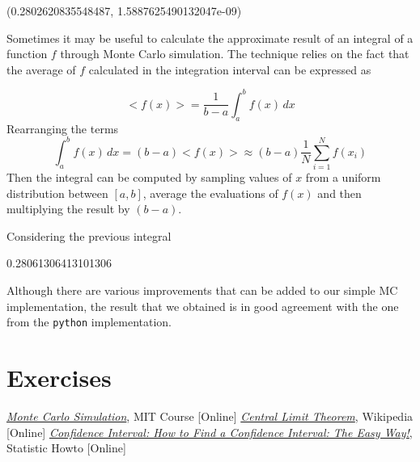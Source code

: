 \begin{ioutput}
(0.2802620835548487, 1.5887625490132047e-09)
\end{ioutput}

Sometimes it may be useful to calculate the approximate result of an integral of a function $f$ through Monte Carlo simulation. The technique relies on the fact that the average of $f$ calculated in the integration interval can be expressed as

\begin{equation}
<f(x)> = \frac{1}{b-a} \int_{a}^{b} f(x) \,dx
\end{equation}
Rearranging the terms
\begin{equation}
\int_{a}^{b} f(x) \,dx = 
(b-a) <f(x)> \approx (b-a) \frac{1}{N} \sum_{i=1}^{N} f(x_i)
\end{equation}
Then the integral can be computed by sampling values of $x$ from a uniform distribution between $[a,b]$, average the evaluations of $f(x)$ and then multiplying the result by $(b-a)$.

Considering the previous integral

\begin{ioutput}
0.28061306413101306
\end{ioutput} 
 
Although there are various improvements that can be added to our simple MC implementation, the result that we obtained is in good agreement with the one from the \texttt{python} implementation.  
 
\section*{Exercises}


\begin{thebibliography}{9}
\href{https://www.youtube.com/watch?v=OgO1gpXSUzU}{\emph{Monte Carlo Simulation}}, MIT Course [Online]
 \href{https://en.wikipedia.org/wiki/Central_limit_theorem}{\emph{Central Limit Theorem}}, Wikipedia [Online]
\href{https://www.statisticshowto.com/probability-and-statistics/confidence-interval}{\emph{Confidence Interval: How to Find a Confidence Interval: The Easy Way!}}, Statistic Howto [Online]
\end{thebibliography}









